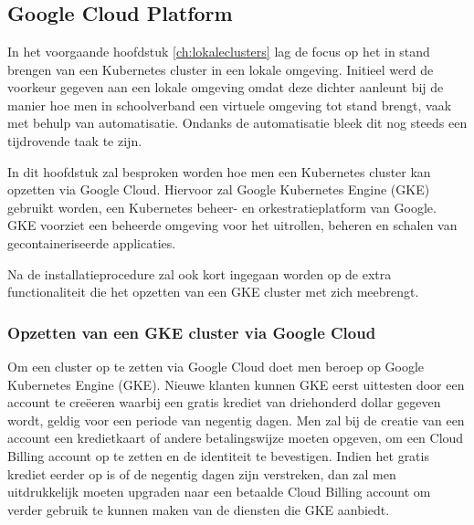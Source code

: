 
\chapter{}
\label{ch:cloudclusters}

\section{Google Cloud Platform}

In het voorgaande hoofdstuk \ref{ch:lokaleclusters} lag de focus op het in stand brengen van een Kubernetes cluster in een lokale omgeving. Initieel werd de voorkeur gegeven aan een lokale omgeving omdat deze dichter aanleunt bij de manier hoe men in schoolverband een virtuele omgeving tot stand brengt, vaak met behulp van automatisatie. Ondanks de automatisatie bleek dit nog steeds een tijdrovende taak te zijn. 

In dit hoofdstuk zal besproken worden hoe men een Kubernetes cluster kan opzetten via Google Cloud. Hiervoor zal Google Kubernetes Engine (GKE) gebruikt worden, een Kubernetes beheer- en orkestratieplatform van Google. GKE voorziet een beheerde omgeving voor het uitrollen, beheren en schalen van gecontaineriseerde applicaties.

Na de installatieprocedure zal ook kort ingegaan worden op de extra functionaliteit die het opzetten van een GKE cluster met zich meebrengt. 

\subsection{Opzetten van een GKE cluster via Google Cloud}
\label{sec:cloudclustersetup}

Om een cluster op te zetten via Google Cloud doet men beroep op Google Kubernetes Engine (GKE). Nieuwe klanten kunnen GKE eerst uittesten door een account te creëeren waarbij een gratis krediet van driehonderd dollar gegeven wordt, geldig voor een periode van negentig dagen. Men zal bij de creatie van een account een kredietkaart of andere betalingswijze moeten opgeven, om een Cloud Billing account op te zetten en de identiteit te bevestigen. Indien het gratis krediet eerder op is of de negentig dagen zijn verstreken, dan zal men uitdrukkelijk moeten upgraden naar een betaalde Cloud Billing account om verder gebruik te kunnen maken van de diensten die GKE aanbiedt. \autocite{GoogleCloud2022} 

